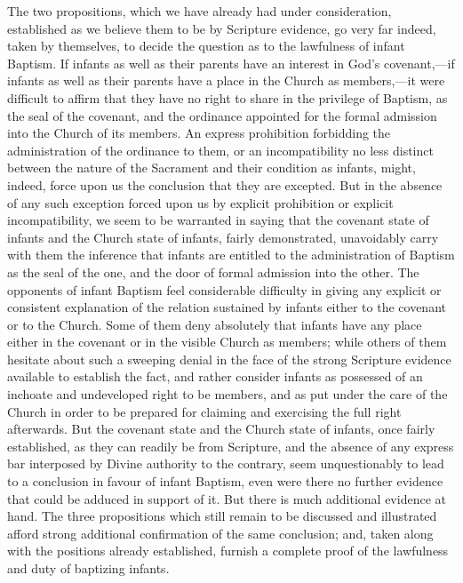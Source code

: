 \documentclass[english,]{book}
\begin{document}
The two propositions, which we have already had under consideration, established as we believe them to be by Scripture evidence, go very far indeed, taken by themselves, to decide the question as to the lawfulness of infant Baptism. If infants as well as their parents have an interest in God's covenant,---if infants as well as their parents have a place in the Church as members,---it were difficult to affirm that they have no right to share in the privilege of Baptism, as the seal of the covenant, and the ordinance appointed for the formal admission into the Church of its members. An express prohibition forbidding the administration of the ordinance to them, or an incompatibility no less distinct between the nature of the Sacrament and their condition as infants, might, indeed, force upon us the conclusion that they are excepted. But in the absence of any such exception forced upon us by explicit prohibition or explicit incompatibility, we seem to be warranted in saying that the covenant state of infants and the Church state of infants, fairly demonstrated, unavoidably carry with them the inference that infants are entitled to the administration of Baptism as the seal of the one, and the door of formal admission into the other. The opponents of infant Baptism feel considerable difficulty in giving any explicit or consistent explanation of the relation sustained by infants either to the covenant or to the Church. Some of them deny absolutely that infants have any place either in the covenant or in the visible Church as members; while others of them hesitate about such a sweeping denial in the face of the strong Scripture evidence available to establish the fact, and rather consider infants as possessed of an inchoate and undeveloped right to be members, and as put under the care of the Church in order to be prepared for claiming and exercising the full right afterwards. But the covenant state and the Church state of infants, once fairly established, as they can readily be from Scripture, and the absence of any express bar interposed by Divine authority to the contrary, seem unquestionably to lead to a conclusion in favour of infant Baptism, even were there no further evidence that could be adduced in support of it. But there is much additional evidence at hand. The three propositions which still remain to be discussed and illustrated afford strong additional confirmation of the same conclusion; and, taken along with the positions already established, furnish a complete proof of the lawfulness and duty of baptizing infants.
\end{document}
